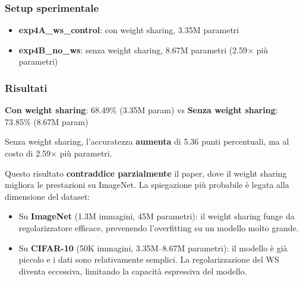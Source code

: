 \documentclass[12pt,a4paper]{article}
\begin{document}
\subsubsection{Setup sperimentale}

\begin{itemize}
    \item \textbf{exp4A\_ws\_control}: con weight sharing, 3.35M parametri
    \item \textbf{exp4B\_no\_ws}: senza weight sharing, 8.67M parametri (2.59$\times$ pi\`u parametri)
\end{itemize}

\subsubsection{Risultati}

\begin{center}
\end{center}

\begin{examplebox}
\textbf{Con weight sharing}: 68.49\% (3.35M param) \quad vs \quad \textbf{Senza weight sharing}: 73.85\% (8.67M param)

Senza weight sharing, l'accuratezza \textbf{aumenta} di 5.36 punti percentuali, ma al costo di 2.59$\times$ pi\`u parametri.

Questo risultato \textbf{contraddice parzialmente} il paper, dove il weight sharing migliora le prestazioni su ImageNet. La spiegazione pi\`u probabile \`e legata alla dimensione del dataset:
\begin{itemize}
    \item Su \textbf{ImageNet} (1.3M immagini, 45M parametri): il weight sharing funge da regolarizzatore efficace, prevenendo l'overfitting su un modello molto grande.
    \item Su \textbf{CIFAR-10} (50K immagini, 3.35M--8.67M parametri): il modello \`e gi\`a piccolo e i dati sono relativamente semplici. La regolarizzazione del WS diventa eccessiva, limitando la capacit\`a espressiva del modello.
\end{itemize}
\end{examplebox}
\end{document}
